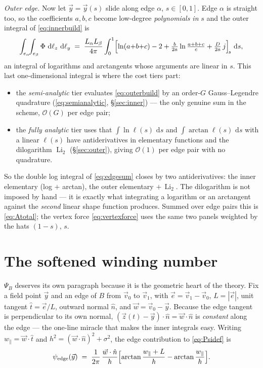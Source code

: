 \documentclass[11pt]{article}
\newcommand{\Li}{\operatorname{Li}_2}
\newcommand{\atan}{\operatorname{arctan}}
\newcommand{\dd}{\,\mathrm{d}}
\begin{document}
\emph{Outer edge.}  Now let $\vec y=\vec y(s)$ slide along edge $\alpha$, $s\in[0,1]$.  Edge
$\alpha$ is straight too, so the coefficients $a,b,c$ become low-degree \emph{polynomials in}
$s$ and the outer integral of \eqref{eq:innerbuild} is
\begin{equation}
  \int_{e_\alpha}\!\!\int_{e_\beta}\Phi\,\dd\ell_z\,\dd\ell_y
  \;=\; \frac{L_\alpha L_\beta}{4\pi}\int_0^1
        \Bigl[\ln(a{+}b{+}c)-2+\tfrac{b}{2a}\ln\tfrac{a+b+c}{c}+\tfrac{D}{2a}\,j\Bigr]_{\!s}\,\dd s ,
  \label{eq:outerbuild}
\end{equation}
an integral of logarithms and arctangents whose arguments are linear in $s$.  This last
one-dimensional integral is where the cost tiers part:
\begin{itemize}
\item the \emph{semi-analytic} tier evaluates \eqref{eq:outerbuild} by an order-$G$
      Gauss--Legendre quadrature (\eqref{eq:semianalytic}, \S\ref{sec:inner}) --- the only
      genuine sum in the scheme, $\mathcal O(G)$ per edge pair;
\item the \emph{fully analytic} tier uses that $\int\ln\ell(s)\,\dd s$ and
      $\int\atan\ell(s)\,\dd s$ with a linear $\ell(s)$ have antiderivatives in elementary
      functions and the dilogarithm $\Li$ (\S\ref{sec:outer}), giving $\mathcal O(1)$ per edge
      pair with no quadrature.
\end{itemize}
So the double log integral of \eqref{eq:edgesum} closes by two antiderivatives: the inner
elementary (log $+$ arctan), the outer elementary $+\,\Li$.  The dilogarithm is not imposed by
hand --- it is exactly what integrating a logarithm or an arctangent against the \emph{second}
linear shape function produces.  Summed over edge pairs this is \eqref{eq:Atotal}; the vertex
force \eqref{eq:vertexforce} uses the same two panels weighted by the hats $(1-s),\,s$.

\section{The softened winding number}
\label{sec:winding}

$\Psi_B$ deserves its own paragraph because it is the geometric heart of the theory.
Fix a field point $\vec y$ and an edge of $B$ from $\vec v_0$ to $\vec v_1$, with
$\vec e=\vec v_1-\vec v_0$, $L=|\vec e|$, unit tangent $\hat t=\vec e/L$, outward
normal $\hat n$, and $\vec w=\vec v_0-\vec y$.  Because the edge tangent is
perpendicular to its own normal, $(\vec z(t)-\vec y)\cdot\hat n = \vec w\cdot\hat n$
is \emph{constant} along the edge --- the one-line miracle that makes the inner
integrals easy.  Writing $w_\parallel=\vec w\cdot\hat t$ and
$h^2 = (\vec w\cdot\hat n)^2+\sigma^2$, the edge contribution to \eqref{eq:Psidef} is
\begin{equation}
  \psi_{\text{edge}}(\vec y)
  \;=\; \frac{1}{2\pi}\,\frac{\vec w\cdot\hat n}{h}
        \Bigl[\atan\frac{w_\parallel+L}{h}-\atan\frac{w_\parallel}{h}\Bigr].
  \label{eq:psiedge}
\end{equation}
\end{document}
